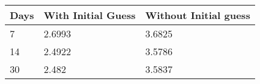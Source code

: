 \begin{tabular}{lll}
Days & With Initial Guess & Without Initial guess \\ 
\hline 
7 & 2.6993 & 3.6825 \\ 
14 & 2.4922 & 3.5786 \\ 
30 & 2.482 & 3.5837 \\ 
\hline 
\end{tabular}